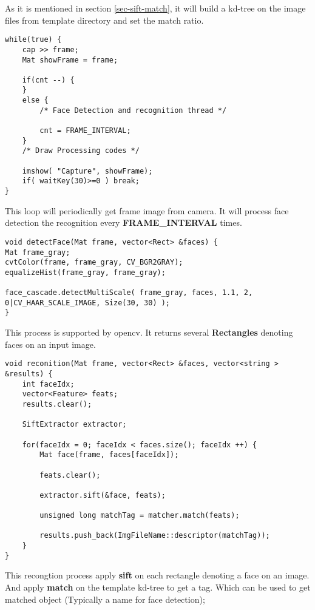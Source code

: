 \documentclass[paper=a4, fontsize=11pt]{scrartcl} %
\newcounter{subsubsubsection}[subsubsection]
\numberwithin{equation}{section} %
\numberwithin{figure}{section} %
\numberwithin{table}{section} %
\begin{document}
As it is mentioned in section \ref{sec-sift-match}, it will build a kd-tree on the image files from template directory and set the match ratio.

\begin{lstlisting}
while(true) {
    cap >> frame;
    Mat showFrame = frame;

    if(cnt --) {
    }
    else {
        /* Face Detection and recognition thread */

        cnt = FRAME_INTERVAL;
    }
    /* Draw Processing codes */ 

    imshow( "Capture", showFrame);
    if( waitKey(30)>=0 ) break;
}
\end{lstlisting}

This loop will periodically get frame image from camera. It will process face detection the recognition every \textbf{FRAME\_INTERVAL} times.


\begin{lstlisting}
void detectFace(Mat frame, vector<Rect> &faces) {
Mat frame_gray;
cvtColor(frame, frame_gray, CV_BGR2GRAY);
equalizeHist(frame_gray, frame_gray);

face_cascade.detectMultiScale( frame_gray, faces, 1.1, 2, 0|CV_HAAR_SCALE_IMAGE, Size(30, 30) );
}
\end{lstlisting}

This process is supported by opencv. It returns several \textbf{Rectangles} denoting faces on an input image.


\begin{lstlisting}
void reconition(Mat frame, vector<Rect> &faces, vector<string > &results) {
    int faceIdx;
    vector<Feature> feats;
    results.clear();

    SiftExtractor extractor;

    for(faceIdx = 0; faceIdx < faces.size(); faceIdx ++) {
        Mat face(frame, faces[faceIdx]);

        feats.clear();

        extractor.sift(&face, feats);

        unsigned long matchTag = matcher.match(feats);

        results.push_back(ImgFileName::descriptor(matchTag));
    }
}
\end{lstlisting}

This recongtion process apply \textbf{sift} on each rectangle denoting a face on an image. And apply \textbf{match} on the template kd-tree to get a tag. Which can be used to get matched object (Typically a name for face detection);
\end{document}
